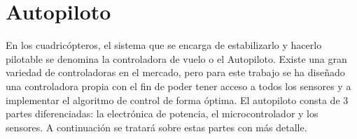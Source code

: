 \section{Autopiloto}

En los cuadricópteros, el sistema que se encarga de estabilizarlo y hacerlo pilotable se denomina la controladora de vuelo o el Autopiloto. Existe una gran variedad de controladoras en el mercado, pero para este trabajo se ha diseñado una controladora propia con el fin de poder tener acceso a todos los sensores y a implementar el algoritmo de control de forma óptima. El autopiloto consta de 3 partes diferenciadas: la electrónica de potencia, el microcontrolador y los sensores. A continuación se tratará sobre estas partes con más detalle.\\



